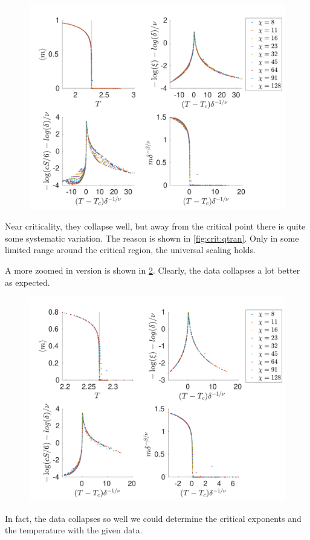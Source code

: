 \begin{figure}[H]
    \center
    \includegraphics[width=\textwidth]{Figuren/phasediag/g0/Full.pdf}
    \caption{  }
    \label{fig:phase:g0:full}
\end{figure}


Near criticality, they collapse well, but away from the critical point there is quite some systematic variation. The reason is shown in \cref{fig:crit:qtran}. Only in some limited range around the critical region, the universal scaling holds.

A more zoomed in version is shown in \cref{fig:phase:g0:zoomed}. Clearly, the data collapses a lot better as expected.
\begin{figure}[H]
    \center
    \includegraphics[width=\textwidth]{Figuren/phasediag/g0/zoomed.pdf}
    \caption{  }
    \label{fig:phase:g0:zoomed}
\end{figure}
In fact, the data collapses so well we could determine the critical exponents and the temperature with the given data.

